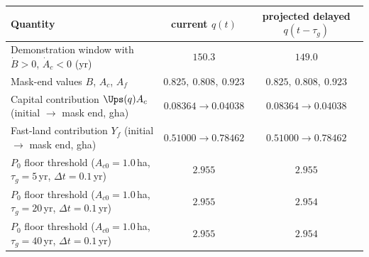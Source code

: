 \begin{tabularx}{\textwidth}{>{\raggedright\arraybackslash}Xcc}
\toprule
Quantity & current $q(t)$ & projected delayed $q(t-\tau_g)$ \\
\midrule
Demonstration window with $\dot B>0$, $\dot A_c<0$ (yr) & $150.3$ & $149.0$ \\
Mask-end values $B$, $A_c$, $A_f$ & $0.825,\ 0.808,\ 0.923$ & $0.825,\ 0.808,\ 0.923$ \\
Capital contribution $\Ups(q)A_c$ (initial $\to$ mask end, gha) & $0.08364\to0.04038$ & $0.08364\to0.04038$ \\
Fast-land contribution $Y_f$ (initial $\to$ mask end, gha) & $0.51000\to0.78462$ & $0.51000\to0.78462$ \\
$P_0$ floor threshold ($A_{c0}=1.0$\,ha, $\tau_g=5$\,yr, $\Delta t=0.1$\,yr) & $2.955$ & $2.955$ \\
$P_0$ floor threshold ($A_{c0}=1.0$\,ha, $\tau_g=20$\,yr, $\Delta t=0.1$\,yr) & $2.955$ & $2.954$ \\
$P_0$ floor threshold ($A_{c0}=1.0$\,ha, $\tau_g=40$\,yr, $\Delta t=0.1$\,yr) & $2.955$ & $2.954$ \\
\bottomrule
\end{tabularx}

